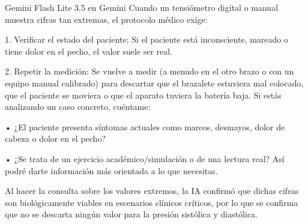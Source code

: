 \documentclass[12pt,a4paper,oneside]{book}
\begin{document}
\begin{iaresp}{Gemini Flash Lite 3.5 en Gemini}
Cuando un tensiómetro digital o manual muestra cifras tan extremas, el protocolo médico exige:

1. Verificar el estado del paciente: Si el paciente está inconsciente, mareado o tiene dolor en el pecho, el valor suele ser real.

2. Repetir la medición: Se vuelve a medir (a menudo en el otro brazo o con un equipo manual calibrado) para descartar que el brazalete estuviera mal colocado, que el paciente se moviera o que el aparato tuviera la batería baja.
Si estás analizando un caso concreto, cuéntame:

• ¿El paciente presenta síntomas actuales como mareos, desmayos, dolor de cabeza o dolor en el pecho?

• ¿Se trata de un ejercicio académico/simulación o de una lectura real?
Así podré darte información más orientada a lo que necesitas.
\end{iaresp}
\begin{iaanalisis}
Al hacer la consulta sobre los valores extremos, la IA confirmó que dichas cifras son biológicamente viables en escenarios clínicos críticos, por lo que se confirma que no se descarta ningún valor para la presión sistólica y diastólica.
\end{iaanalisis}
\end{document}
